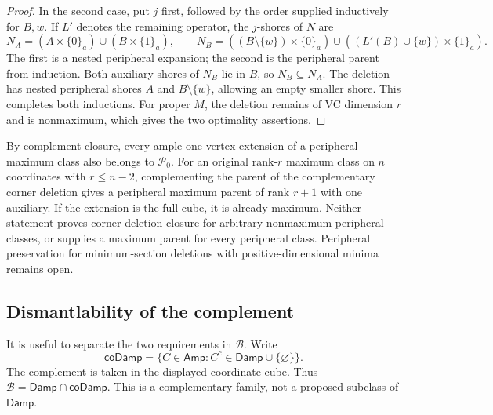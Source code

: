 \documentclass[11pt]{article}
\theoremstyle{definition}
\newcommand{\Amp}{\mathsf{Amp}}
\newcommand{\Damp}{\mathsf{Damp}}
\begin{document}
\begin{proof}
In the second case, put $j$ first, followed by the order supplied
inductively for $B,w$. If $L'$ denotes the remaining operator, the
$j$-shores of $N$ are
\[
 N_A=(A\times\{0\}_a)\cup(B\times\{1\}_a),\qquad
 N_B=((B\setminus\{w\})\times\{0\}_a)
       \cup((L'(B)\cup\{w\})\times\{1\}_a).
\]
The first is a nested peripheral expansion; the second is the peripheral
parent from induction. Both auxiliary shores of $N_B$ lie in $B$, so
$N_B\subseteq N_A$. The deletion has nested peripheral shores $A$ and
$B\setminus\{w\}$, allowing an empty smaller shore. This completes
both inductions. For proper $M$, the deletion remains of VC dimension
$r$ and is nonmaximum, which gives the two optimality assertions.
\end{proof}

By complement closure, every ample one-vertex extension of a peripheral
maximum class also belongs to $\mathcal P_0$. For an original rank-$r$
maximum class on $n$ coordinates with $r\le n-2$, complementing the
parent of the complementary corner deletion gives a peripheral maximum
parent of rank $r+1$ with one auxiliary. If the extension is the full
cube, it is already maximum. Neither statement proves corner-deletion
closure for arbitrary nonmaximum peripheral classes, or supplies a
maximum parent for every peripheral class. Peripheral preservation for
minimum-section deletions with positive-dimensional minima remains open.

\subsection{Dismantlability of the complement}
\label{sec:complement-dismantlable}

It is useful to separate the two requirements in $\mathcal B$. Write
\[
 \mathsf{coDamp}=\{C\in\Amp:C^c\in\Damp\cup\{\varnothing\}\}.
\]
The complement is taken in the displayed coordinate cube. Thus
$\mathcal B=\Damp\cap\mathsf{coDamp}$. This is a complementary family,
not a proposed subclass of $\Damp$.
\end{document}
